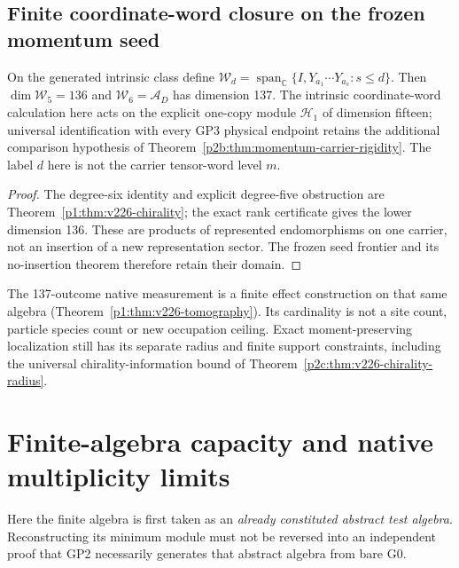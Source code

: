 \documentclass[12pt,a4paper]{article}
\begin{document}
\subsection{Finite coordinate-word closure on the frozen momentum seed}
\label{p2b:sec:v226-coordinate-words}
\begin{corollary}
\label{p2b:cor:v226-coordinate-word-degree}
On the generated intrinsic class define
$\mathcal W_d=\operatorname{span}_{\mathbb C}\{I,Y_{a_1}\cdots Y_{a_s}:s\le d\}$.
Then $\dim\mathcal W_5=136$ and
$\mathcal W_6=\mathcal A_D$ has dimension 137. The intrinsic coordinate-word calculation here acts on the explicit
one-copy module $\mathcal H_1$ of dimension fifteen; universal
identification with every GP3 physical endpoint retains the additional
comparison hypothesis of Theorem~\ref{p2b:thm:momentum-carrier-rigidity}.
The label $d$ here is not the carrier tensor-word level $m$.
\end{corollary}
\begin{proof}
The degree-six identity and explicit degree-five obstruction are
Theorem~\ref{p1:thm:v226-chirality}; the exact rank certificate gives the
lower dimension 136. These are products of represented endomorphisms on
one carrier, not an insertion of a new representation sector. The frozen
seed frontier and its no-insertion theorem therefore retain their domain.
\end{proof}
The 137-outcome native measurement is a finite effect construction on that
same algebra (Theorem~\ref{p1:thm:v226-tomography}). Its cardinality is not
a site count, particle species count or new occupation ceiling. Exact
moment-preserving localization still has its separate radius and finite
support constraints, including the universal chirality-information bound
of Theorem~\ref{p2c:thm:v226-chirality-radius}.


\section{Finite-algebra capacity and native multiplicity limits}
\label{p2b:sec:v352-capacity-topology}
Here the finite algebra is first taken as an \emph{already constituted
abstract test algebra}.  Reconstructing its minimum module must not
be reversed into an independent proof that GP2 necessarily generates
that abstract algebra from bare G0.
\end{document}
